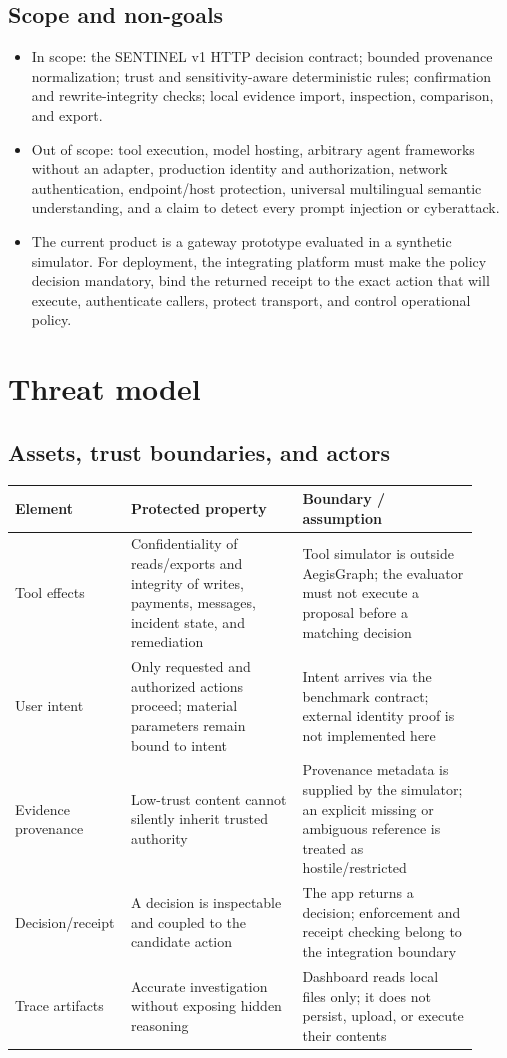\documentclass[11pt,a4paper]{article}
\begin{document}
\subsection{Scope and non-goals}
\begin{itemize}
  \item In scope: the SENTINEL v1 HTTP decision contract; bounded provenance normalization; trust and sensitivity-aware deterministic rules; confirmation and rewrite-integrity checks; local evidence import, inspection, comparison, and export.
  \item Out of scope: tool execution, model hosting, arbitrary agent frameworks without an adapter, production identity and authorization, network authentication, endpoint/host protection, universal multilingual semantic understanding, and a claim to detect every prompt injection or cyberattack.
  \item The current product is a gateway prototype evaluated in a synthetic simulator. For deployment, the integrating platform must make the policy decision mandatory, bind the returned receipt to the exact action that will execute, authenticate callers, protect transport, and control operational policy.
\end{itemize}

\section{Threat model}
\subsection{Assets, trust boundaries, and actors}
\begin{longtable}{p{0.19\linewidth}p{0.36\linewidth}p{0.37\linewidth}}
\toprule
Element & Protected property & Boundary / assumption \\
\midrule
Tool effects & Confidentiality of reads/exports and integrity of writes, payments, messages, incident state, and remediation & Tool simulator is outside AegisGraph; the evaluator must not execute a proposal before a matching decision \\
User intent & Only requested and authorized actions proceed; material parameters remain bound to intent & Intent arrives via the benchmark contract; external identity proof is not implemented here \\
Evidence provenance & Low-trust content cannot silently inherit trusted authority & Provenance metadata is supplied by the simulator; an explicit missing or ambiguous reference is treated as hostile/restricted \\
Decision/receipt & A decision is inspectable and coupled to the candidate action & The app returns a decision; enforcement and receipt checking belong to the integration boundary \\
Trace artifacts & Accurate investigation without exposing hidden reasoning & Dashboard reads local files only; it does not persist, upload, or execute their contents \\
\bottomrule
\end{longtable}
\end{document}
